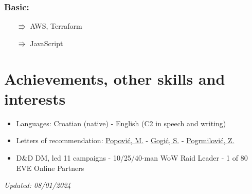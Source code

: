 \documentclass[a4paper]{article}
\newcommand{\bolditalicpair}
[2]
{\textbf{#1} \texorpdfstring{\hfill}{} \textit{#2}}
\begin{document}
\subsubsection{\bolditalicpair{Basic:}{}}

\begin{itemize}
  \item[$\Rrightarrow$] AWS, Terraform
  \item[$\Rrightarrow$] JavaScript
\end{itemize}



\section{Achievements, other skills and interests}

\begin{itemize}
  \item Languages: Croatian (native) - English (C2 in speech and writing)
  \item Letters of recommendation: \href{https://github.com/MislavJaksic/CV/blob/master/LoR/AISoft_Popovic.pdf}{Popović, M.} - \href{https://github.com/MislavJaksic/CV/blob/master/LoR/Atos_Gogic.pdf}{Gogić, S.} - \href{https://github.com/MislavJaksic/CV/blob/master/LoR/Atos_Pogrmilovic.pdf}{Pogrmilović, Z.}
  \item D\&D DM, led 11 campaigns - 10/25/40-man WoW Raid Leader - 1 of 80 EVE Online Partners
\end{itemize}

\bolditalicpair{}{Updated: 08/01/2024}
\end{document}
